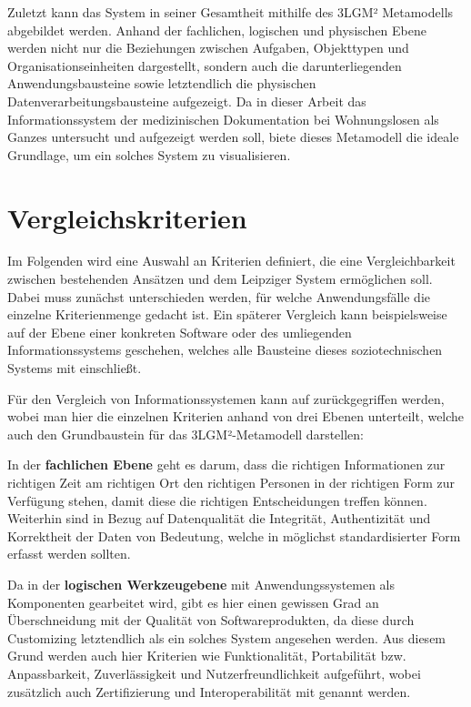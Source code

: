 Zuletzt kann das System in seiner Gesamtheit mithilfe des 3LGM² Metamodells abgebildet werden. Anhand der fachlichen, logischen und physischen Ebene werden nicht nur die Beziehungen zwischen Aufgaben, Objekttypen und Organisationseinheiten dargestellt, sondern auch die darunterliegenden Anwendungsbausteine sowie letztendlich die physischen Datenverarbeitungsbausteine aufgezeigt. Da in dieser Arbeit das Informationssystem der medizinischen Dokumentation bei Wohnungslosen als Ganzes untersucht und aufgezeigt werden soll, biete dieses Metamodell die ideale Grundlage, um ein solches System zu visualisieren.


\section{Vergleichskriterien}\label{sec:criteria}

Im Folgenden wird eine Auswahl an Kriterien definiert, die eine Vergleichbarkeit zwischen bestehenden Ansätzen und dem Leipziger System ermöglichen soll. Dabei muss zunächst unterschieden werden, für welche Anwendungsfälle die einzelne Kriterienmenge gedacht ist. Ein späterer Vergleich kann beispielsweise auf der Ebene einer konkreten Software oder des umliegenden Informationssystems geschehen, welches alle Bausteine dieses soziotechnischen Systems mit einschließt.

Für den Vergleich von Informationssystemen kann auf \citet{Winter.2023} zurückgegriffen werden, wobei man hier die einzelnen Kriterien anhand von drei Ebenen unterteilt, welche auch den Grundbaustein für das 3LGM²-Metamodell darstellen:

In der \textbf{fachlichen Ebene} geht es darum, dass die richtigen Informationen zur richtigen Zeit am richtigen Ort den richtigen Personen in der richtigen Form zur Verfügung stehen, damit diese die richtigen Entscheidungen treffen können. Weiterhin sind in Bezug auf Datenqualität die Integrität, Authentizität und Korrektheit der Daten von Bedeutung, welche in möglichst standardisierter Form erfasst werden sollten.

Da in der \textbf{logischen Werkzeugebene} mit Anwendungssystemen als Komponenten gearbeitet wird, gibt es hier einen gewissen Grad an Überschneidung mit der Qualität von Softwareprodukten, da diese durch Customizing letztendlich als ein solches System angesehen werden. Aus diesem Grund werden auch hier Kriterien wie Funktionalität, Portabilität bzw. Anpassbarkeit, Zuverlässigkeit und Nutzerfreundlichkeit aufgeführt, wobei zusätzlich auch Zertifizierung und Interoperabilität mit genannt werden.


